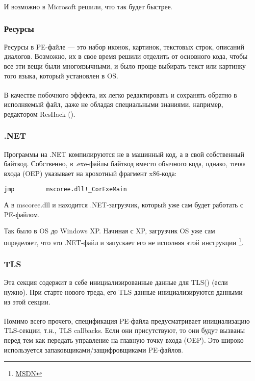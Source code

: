 И возможно в Microsoft решили, что так будет быстрее.

\subsubsection{Ресурсы}

\label{PEresources}
Ресурсы в PE-файле --- это набор иконок, картинок, текстовых строк, описаний диалогов.
Возможно, их в свое время решили отделить от основного кода, чтобы все эти вещи были многоязычными,
и было проще выбирать текст или картинку того языка, который установлен в \ac{OS}. \\
\\
В качестве побочного эффекта, их легко редактировать и сохранять обратно в исполняемый файл,
даже не обладая специальными знаниями, например, редактором ResHack ().

\subsubsection{.NET}

Программы на .NET компилируются не в машинный код, а в свой собственный байткод.
Собственно, в .exe-файлы байткод вместо обычного кода, однако, точка входа (\ac{OEP}) 
указывает на крохотный фрагмент x86-кода:

\begin{lstlisting}
jmp         mscoree.dll!_CorExeMain
\end{lstlisting}

А в mscoree.dll и находится .NET-загрузчик, который уже сам будет работать с PE-файлом.

Так было в \ac{OS} до Windows XP. Начиная с XP, загрузчик \ac{OS} уже сам определяет, что это
.NET-файл и запускает его не исполняя этой инструкции \JMP
\footnote{\href{http://go.yurichev.com/17051}{MSDN}}.

\subsubsection{TLS}

Эта секция содержит в себе инициализированные данные для \ac{TLS}() (если нужно).
При старте нового треда, его \ac{TLS}-данные инициализируются данными из этой секции. \\
\\
Помимо всего прочего, спецификация PE-файла предусматривает инициализацию \ac{TLS}-секции, т.н., TLS callbacks.
Если они присутствуют, то они будут вызваны перед тем как передать управление на главную точку входа (\ac{OEP}).
Это широко используется запаковщиками/защифровщиками PE-файлов.

